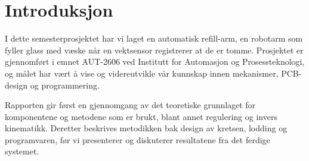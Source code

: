 \section{Introduksjon}
I dette semesterprosjektet har vi laget en automatisk refill-arm, en robotarm som fyller glass med væske når en vektsensor registrerer at de er tomme. Prosjektet er gjennomført i emnet AUT-2606 ved Institutt for Automasjon og Prosessteknologi, og målet har vært å vise og videreutvikle vår kunnskap innen mekanismer, PCB-design og programmering.

Rapporten gir først en gjennomgang av det teoretiske grunnlaget for komponentene og metodene som er brukt, blant annet regulering og invers kinematikk. Deretter beskrives metodikken bak design av kretsen, lodding og programvaren, før vi presenterer og diskuterer resultatene fra det ferdige systemet.